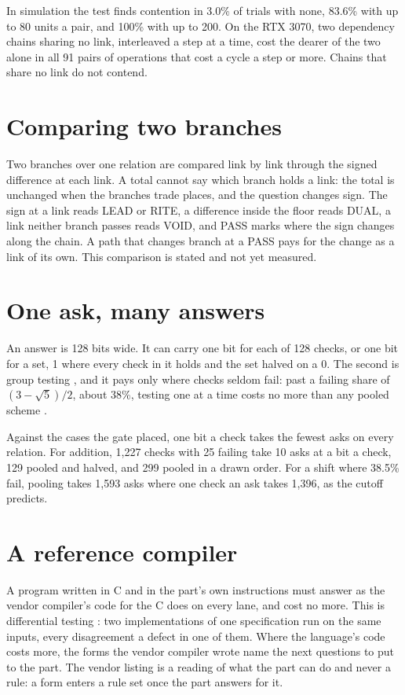 In simulation the test finds contention in 3.0\% of trials with none, 83.6\% with up to 80 units
a pair, and 100\% with up to 200. On the RTX 3070, two dependency chains sharing no link,
interleaved a step at a time, cost the dearer of the two alone in all 91 pairs of operations that
cost a cycle a step or more. Chains that share no link do not contend.

\section{Comparing two branches}

Two branches over one relation are compared link by link through the signed difference at each
link. A total cannot say which branch holds a link: the total is unchanged when the branches
trade places, and the question changes sign. The sign at a link reads LEAD or RITE, a difference
inside the floor reads DUAL, a link neither branch passes reads VOID, and PASS marks where the
sign changes along the chain. A path that changes branch at a PASS pays for the change as a link
of its own. This comparison is stated and not yet measured.

\section{One ask, many answers}

An answer is 128 bits wide. It can carry one bit for each of 128 checks, or one bit for a set,
1 where every check in it holds and the set halved on a 0. The second is group testing
\cite{src:Dorfman}, and it pays only where checks seldom fail: past a failing share of
\((3-\sqrt5)/2\), about 38\%, testing one at a time costs no more than any pooled scheme
\cite{src:Ungar}.

Against the cases the gate placed, one bit a check takes the fewest asks on every relation. For
addition, 1,227 checks with 25 failing take 10 asks at a bit a check, 129 pooled and halved, and
299 pooled in a drawn order. For a shift where 38.5\% fail, pooling takes 1,593 asks where one
check an ask takes 1,396, as the cutoff predicts.

\section{A reference compiler}

A program written in C and in the part's own instructions must answer as the vendor compiler's
code for the C does on every lane, and cost no more. This is differential testing
\cite{src:McKeeman}: two implementations of one specification run on the same inputs, every
disagreement a defect in one of them. Where the language's code costs more, the forms the vendor
compiler wrote name the next questions to put to the part. The vendor listing is a reading of
what the part can do and never a rule: a form enters a rule set once the part answers for it.

